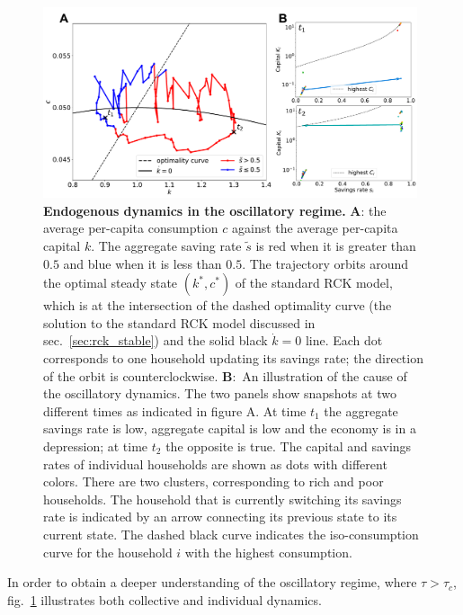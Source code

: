 \begin{figure}[t]
     \centering
       \includegraphics[width=0.98\textwidth]
       {figures/fig3.pdf}
       \caption[Endogenous dynamics in the oscillatory regime]{\textbf{ Endogenous dynamics in the oscillatory regime. } \textbf{A}: the average per-capita consumption $c$ against the average per-capita capital $k$. The aggregate saving rate $\tilde{s}$ is red when it is greater than $0.5$ and blue when it is less than $0.5$. The trajectory orbits around the optimal steady state $(k^\ast,c^\ast)$  of the standard RCK model, which is at the intersection of the dashed optimality curve (the solution to the standard RCK model discussed in sec.~\ref{sec:rck_stable}) and the solid black $\dot{k}=0$ line. Each dot corresponds to one household updating its savings rate; the direction of the orbit is counterclockwise.
\textbf{B}:~An illustration of the cause of the oscillatory dynamics.  The two panels show snapshots at two different times as indicated in figure A.  At time $t_1$ the aggregate savings rate is low, aggregate capital is low and the economy is in a depression; at time $t_2$ the opposite is true.  The capital and savings rates of individual households are shown as dots with different colors.  There are two clusters, corresponding to rich and poor households.  The household that is currently switching its savings rate is indicated by an arrow connecting its previous state to its current state.  The dashed black curve indicates the iso-consumption curve for the household $i$ with the highest consumption. }
\label{fig:dynamics}
\end{figure} 


In order to obtain a deeper understanding of the oscillatory regime, where $\tau > \tau_{c}$, fig.~\ref{fig:dynamics} illustrates both collective and individual dynamics.

